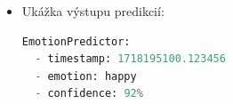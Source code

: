\begin{itemize}
\item Ukážka výstupu predikcií:
\begin{lstlisting}[language=Python]
EmotionPredictor:
  - timestamp: 1718195100.123456
  - emotion: happy
  - confidence: 92%
\end{lstlisting}
\end{itemize}

